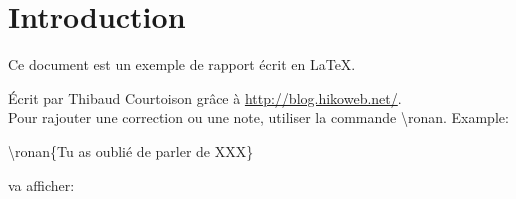 \section*{Introduction} %

Ce document est un exemple de rapport écrit en \LaTeX.

Écrit par Thibaud Courtoison grâce à \url{http://blog.hikoweb.net/}.\\

Pour rajouter une correction ou une note, utiliser la commande \textbackslash{}ronan. Example:

\textbackslash{}ronan\{Tu as oublié de parler de XXX\}

va afficher:


